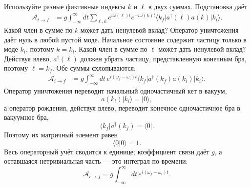 \begin{classroomqa}
\end{classroomqa}

Используйте разные фиктивные индексы \(k\) и \(\ell\) в двух суммах. Подстановка даёт
\begin{align}
\mathcal A_{i\to f}
&=g\int_{-\infty}^{\infty}dt
\sum_{\ell,k}
e^{i\omega(\ell)t}e^{-i\omega(k)t}
\langle k_f\rvert a^\dagger(\ell)a(k)\lvert k_i\rangle.
\end{align}
Какой член в сумме по \(k\) может дать ненулевой вклад? Оператор уничтожения даёт нуль в любой пустой моде. Начальное состояние содержит частицу только в моде \(k_i\), поэтому \(k=k_i\). Какой член в сумме по \(\ell\) может дать ненулевой вклад? Действуя влево, \(a^\dagger(\ell)\) должен убрать частицу, представленную конечным бра, поэтому \(\ell=k_f\). Обе суммы схлопываются:
\begin{align}
\mathcal A_{i\to f}
&=g\int_{-\infty}^{\infty}dt\,
e^{i(\omega_f-\omega_i)t}
\langle k_f\rvert a^\dagger(k_f)a(k_i)\lvert k_i\rangle.
\end{align}
Оператор уничтожения переводит начальный одночастичный кет в вакуум,
\begin{equation}
a(k_i)\lvert k_i\rangle=\lvert0\rangle,
\end{equation}
а оператор рождения, действуя влево, переводит конечное одночастичное бра в вакуумное бра,
\begin{equation}
\langle k_f\rvert a^\dagger(k_f)=\langle0\rvert.
\end{equation}
Поэтому их матричный элемент равен
\begin{equation}
\langle0\vert0\rangle=1.
\end{equation}
Весь операторный учёт сводится к единице; коэффициент связи даёт \(g\), а оставшаяся нетривиальная часть — это интеграл по времени:
\begin{equation}
\mathcal A_{i\to f}
=g\int_{-\infty}^{\infty}dt\,
e^{i(\omega_f-\omega_i)t}.
\end{equation}


